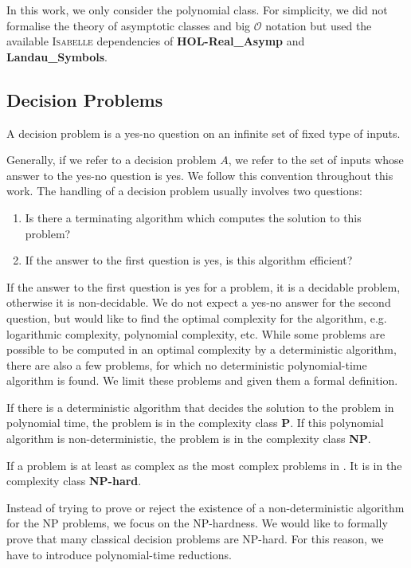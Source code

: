 In this work, we only consider the polynomial class. For simplicity, we did not 
formalise the theory of asymptotic classes and big $\mathcal{O}$ notation but used the 
available \textsc{Isabelle} dependencies of \textbf{HOL-Real\_Asymp} and \textbf{Landau\_Symbols}.

\subsection*{Decision Problems}
\begin{definition}
    A decision problem is a yes-no question on an infinite set of fixed type of inputs.
\end{definition}
Generally, if we refer to a decision problem $A$, we refer to the set of inputs whose answer to the yes-no question is yes. 
We follow this convention throughout this work.
The handling of a decision problem usually involves two questions:
\begin{enumerate}
    \item Is there a terminating algorithm which computes the solution to this problem?
    \item If the answer to the first question is yes, is this algorithm efficient?
\end{enumerate}
If the answer to the first question is yes for a problem, it is a decidable problem, otherwise it is non-decidable. 
We do not expect a yes-no answer for the second question, but would like to find 
the optimal complexity for the algorithm, e.g. logarithmic complexity, polynomial complexity, etc. 
While some problems are possible to be computed in an optimal complexity by a deterministic algorithm, 
there are also a few problems, for which no deterministic polynomial-time algorithm is found. 
We limit these problems and given them a formal definition.
\begin{definition}
    If there is a deterministic algorithm that decides the solution 
    to the problem in polynomial time, the problem is in the complexity class \textbf{P}.
    If this polynomial algorithm is non-deterministic, the problem is in the complexity class \textbf{NP}. 
\end{definition}
\begin{definition}
If a problem is at least as complex as the most complex problems in \NP. It is 
    in the complexity class \textbf{NP-hard}.
\end{definition}

Instead of trying to prove or reject the existence of a non-deterministic algorithm 
for the NP problems, we focus on the NP-hardness. We would like to formally prove 
that many classical decision problems are NP-hard. For this reason, we have to introduce polynomial-time reductions.

